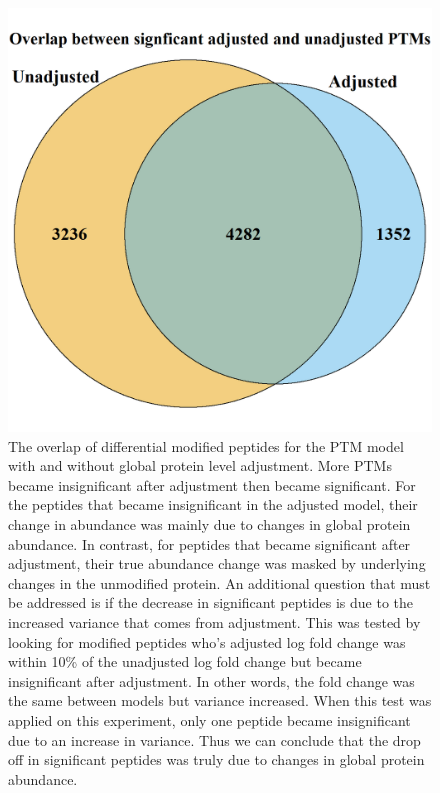 \documentclass{mcp}
\begin{document}
\begin{figure}[h!]
\centering
\includegraphics[height=.65\textwidth]{sim_new/ipah_venn_diagramm.png}
\caption{The overlap of differential modified peptides for the PTM model with and without global protein level adjustment. More PTMs became insignificant after adjustment then became significant. For the peptides that became insignificant in the adjusted model, their change in abundance was mainly due to changes in global protein abundance. In contrast, for peptides that became significant after adjustment, their true abundance change was masked by underlying changes in the unmodified protein. An additional question that must be addressed is if the decrease in significant peptides is due to the increased variance that comes from adjustment. This was tested by looking for modified peptides who's adjusted log fold change was within 10\% of the unadjusted log fold change but became insignificant after adjustment. In other words, the fold change was the same between models but variance increased. When this test was applied on this experiment, only one peptide became insignificant due to an increase in variance. Thus we can conclude that the drop off in significant peptides was truly due to changes in global protein abundance.}
\label{fig:ipha_venn_d}
\end{figure}
\end{document}
